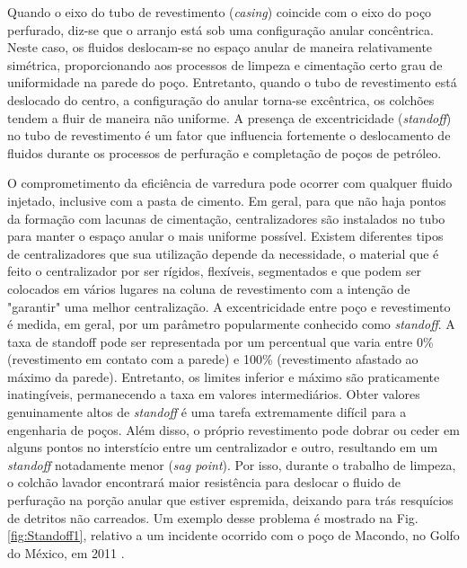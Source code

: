 Quando o eixo do tubo de revestimento (\textit{casing}) coincide com o eixo do poço perfurado, diz-se que o arranjo está sob uma configuração anular concêntrica. Neste caso, os fluidos deslocam-se no espaço anular de maneira relativamente simétrica, proporcionando aos processos de limpeza e cimentação certo grau de uniformidade na parede do poço. Entretanto, quando o tubo de revestimento está deslocado do centro, a configuração do anular torna-se excêntrica, os colchões tendem a fluir de maneira não uniforme. A presença de excentricidade (\textit{standoff}) no tubo de revestimento é um fator que influencia fortemente o deslocamento de fluidos durante os processos de perfuração e completação de poços de petróleo.

O comprometimento da eficiência de varredura pode ocorrer com qualquer fluido injetado, inclusive com a pasta de cimento. Em geral, para que não haja pontos da formação com lacunas de cimentação, centralizadores são instalados no tubo para manter o espaço anular o mais uniforme possível. Existem diferentes tipos de centralizadores que sua utilização depende da necessidade, o material que é feito o centralizador por ser rígidos, flexíveis, segmentados e que podem ser colocados em vários lugares na coluna de revestimento com a intenção de "garantir" uma melhor centralização.
A excentricidade entre poço e revestimento é medida, em geral, por um parâmetro popularmente conhecido como \textit{standoff}. A taxa de standoff pode ser representada por um percentual que varia entre 0\% (revestimento em contato com a parede) e 100\% (revestimento afastado ao máximo da parede). Entretanto, os limites inferior e máximo são praticamente inatingíveis, permanecendo a taxa em valores intermediários. 
Obter valores genuinamente altos de \textit{standoff} é uma tarefa extremamente difícil para a engenharia de poços. Além disso, o próprio revestimento pode dobrar ou ceder em alguns pontos no interstício entre um centralizador e outro, resultando em um \textit{standoff} notadamente menor (\textit{sag point}). Por isso, durante o trabalho de limpeza, o colchão lavador encontrará maior resistência para deslocar o fluido de perfuração na porção anular que estiver espremida, deixando para trás resquícios de detritos não carreados. Um exemplo desse problema é mostrado na Fig. \ref{fig:Standoff1}, relativo a um incidente ocorrido com o poço de Macondo, no Golfo do México, em 2011 
\cite{Macondo,Hanieh}.
